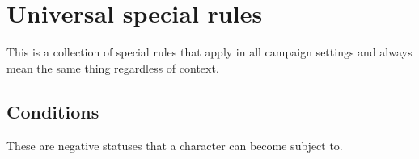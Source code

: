 \documentclass[a4paper,10pt,oneside]{book}
\newcommand{\textlf}[1]{\textbf{\titlecap{#1}}}
\begin{document}
%
%
%
%
%
%


\section{Universal special rules}
\label{sec:special}
This is a collection of special rules that apply in all campaign settings and always mean the same thing regardless of context.


\subsection{Conditions}
These are negative statuses that a character can become subject to. 
\end{document}

